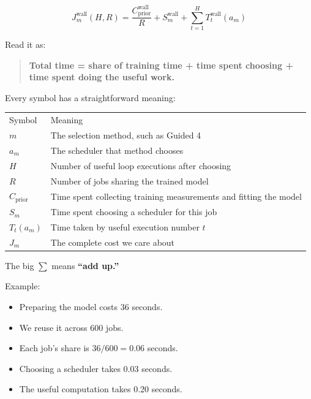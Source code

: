 \documentclass[11pt,a4paper]{article}
\providecommand{\tightlist}{\setlength{\itemsep}{0pt}\setlength{\parskip}{3pt}}
\newcommand{\toprule}{\hline\noalign{\vskip3pt}}
\newcommand{\midrule}{\noalign{\vskip2pt}\hline\noalign{\vskip3pt}}
\newcommand{\bottomrule}{\noalign{\vskip3pt}\hline}
\begin{document}
\begin{enumerate}
  \[
  J_m^{\mathrm{wall}}(H,R)
  =
  \frac{C_{\mathrm{prior}}^{\mathrm{wall}}}{R}
  +
  S_m^{\mathrm{wall}}
  +
  \sum_{t=1}^{H}T_t^{\mathrm{wall}}(a_m)
  \]

  Read it as:

  \begin{quote}
  \textbf{Total time = share of training time + time spent choosing + time spent doing the useful work.}
  \end{quote}

  Every symbol has a straightforward meaning:

  {\def\LTcaptype{none} %
  \begin{longtable}[]{@{}
    >{\raggedright\arraybackslash}p{}
    >{\raggedright\arraybackslash}p{}@{}}
  \toprule\noalign{}
  \begin{minipage}[b]{\linewidth}\raggedright
  Symbol
  \end{minipage} & \begin{minipage}[b]{\linewidth}\raggedright
  Meaning
  \end{minipage} \\
  \midrule\noalign{}
  \endhead
  \bottomrule\noalign{}
  \endlastfoot
  \(m\) & The selection method, such as Guided 4 \\
  \(a_m\) & The scheduler that method chooses \\
  \(H\) & Number of useful loop executions after choosing \\
  \(R\) & Number of jobs sharing the trained model \\
  \(C_{\mathrm{prior}}\) & Time spent collecting training measurements and fitting the model \\
  \(S_m\) & Time spent choosing a scheduler for this job \\
  \(T_t(a_m)\) & Time taken by useful execution number \(t\) \\
  \(J_m\) & The complete cost we care about \\
  \end{longtable}
  }

  The big \(\sum\) means \textbf{``add up.''}

  Example:

  \begin{itemize}
  \tightlist
  \item
    Preparing the model costs 36 seconds.
  \item
    We reuse it across 600 jobs.
  \item
    Each job's share is \(36/600=0.06\) seconds.
  \item
    Choosing a scheduler takes 0.03 seconds.
  \item
    The useful computation takes 0.20 seconds.
  \end{itemize}


\end{enumerate}
\end{document}
